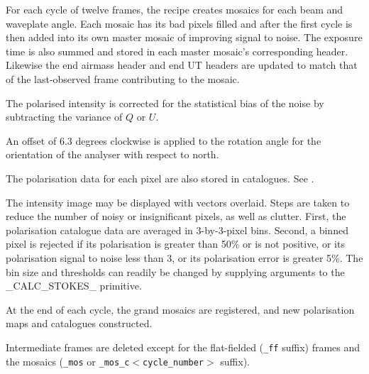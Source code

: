 \documentclass[twoside,11pt,nolof]{starlink}
\begin{document}
{{{         \sstitem
         For each cycle of twelve frames, the recipe creates mosaics
         for each beam and waveplate angle.  Each mosaic has its bad pixels
         filled and after the first cycle is then added into its own master
         mosaic of improving signal to noise.  The exposure time is also
         summed and stored in each master mosaic's corresponding
	 header.  Likewise the end airmass header and end UT headers
	 are updated to match that of the last-observed frame
	 contributing to the mosaic.

         \sstitem
         The polarised intensity is corrected for the statistical bias
         of the noise by subtracting the variance of $Q$ or $U$.

         \sstitem
         An offset of 6.3 degrees clockwise is applied to the rotation
         angle for the orientation of the analyser with respect to north.

         \sstitem
         The polarisation data for each pixel are also stored in
         catalogues.  See .

         \sstitem
         The intensity image may be displayed with vectors overlaid.
         Steps are taken to reduce the number of noisy or insignificant
         pixels, as well as clutter.  First, the polarisation catalogue data
         are averaged in 3-by-3-pixel bins.  Second, a binned pixel is
         rejected if its polarisation is greater than 50\% or is not positive,
         or its polarisation signal to noise less than 3, or its polarisation
         error is greater 5\%.  The bin size and thresholds can readily be
         changed by supplying arguments to the \_CALC\_STOKES\_ primitive.

         \sstitem
         At the end of each cycle, the grand mosaics are registered, and
         new polarisation maps and catalogues constructed.

         \sstitem
         Intermediate frames are deleted except for the flat-fielded ({\tt\_ff}
         suffix) frames and the mosaics ({\tt\_mos} or
         {\tt\_mos\_c$<$cycle\_number$>$} suffix).
      }
   }
   \label{pe_data}
   }
\end{document}

